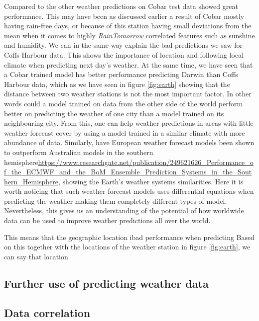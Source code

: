 \documentclass[11pt]{article}
\begin{document}
Compared to the other weather predictions on Cobar test data showed great performance. This may have been as discussed earlier a result of Cobar mostly having rain-free days, or because of this station having small deviations from the mean when it comes to highly \textit{RainTomorrow} correlated features such as sunshine and humidity. We can in the same way explain the bad predictions we saw for Coffs Harbour data. This shows the importance of location and following local climate when predicting next day's weather.
At the same time, we have seen that a Cobar trained model has better performance predicting Darwin than Coffs Harbour data, which as we have seen in figure \ref{fig:earth} showing that the distance between two weather stations is not the most important factor. In other words could a model trained on data from the other side of the world perform better on predicting the weather of one city than a model trained on its neighbouring city. From this, one can help weather predictions in areas with little weather forecast cover by using a model trained in a similar climate with more abundance of data. Similarly, have European weather forecast models been shown to outperform Australian models in the southern hemisphere\url{https://www.researchgate.net/publication/249621626_Performance_of_the_ECMWF_and_the_BoM_Ensemble_Prediction_Systems_in_the_Southern_Hemisphere}, showing the Earth's weather systems similarities. Here it is worth noticing that such weather forecast models uses differential equations when predicting the weather making them completely different types of model. Nevertheless, this gives us an understanding of the potential of how worldwide data can be used to improve weather predictions all over the world.

This means that the geographic location ibad performance when predicting
Based on this together with the locations of the weather station in figure \ref{fig:earth}, we can say that location

\subsection{Further use of predicting weather data}


\subsection{Data correlation} %
\label{sub:Data correlation}

\end{document}

